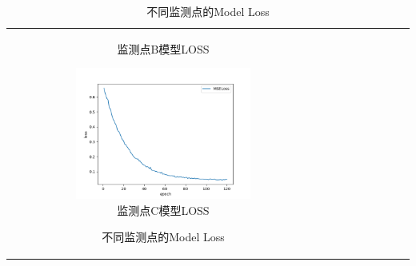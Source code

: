 \documentclass[bwprint]{gmcmthesis}
\numberwithin{figure}{section}
\begin{document}
\begin{table}
\begin{center}
{\begin{tabular}[ht]{|c|c|c|c|c|c|c|c|c|}
\begin{figure}
\begin{subfigure}[ht]{.3\textwidth}
		\caption{监测点B模型LOSS}
		\label{B_model_loss}
	\end{subfigure}
	\begin{subfigure}[ht]{.3\textwidth}
		\centering
		\includegraphics[width=\textwidth]{figures/Model_loss_C.png}
		\caption{监测点C模型LOSS}
		\label{C_model_loss}
	\end{subfigure}
	\caption{不同监测点的Model Loss}
	\label{model_loss}
\end{figure}


\end{tabular}}
\end{center}
\end{table}
\end{document}
